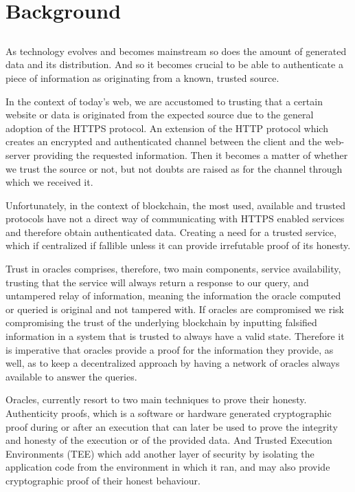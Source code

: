 \chapter{Background}\label{chap:chap3}

\section*{}
As technology evolves and becomes mainstream so does the amount of generated data and its distribution. And so it becomes crucial to be able to authenticate a piece of information as originating from a known, trusted source.

In the context of today's web, we are accustomed to trusting that a certain website or data is originated from the expected source due to the general adoption of the HTTPS protocol. An extension of the HTTP protocol which creates an encrypted and authenticated channel between the client and the web-server providing the requested information. Then it becomes a matter of whether we trust the source or not, but not doubts are raised as for the channel through which we received it.

Unfortunately, in the context of blockchain, the most used, available and trusted protocols have not a direct way of communicating with HTTPS enabled services and therefore obtain authenticated data. Creating a need for a trusted service, which if centralized if fallible unless it can provide irrefutable proof of its honesty.

Trust in oracles comprises, therefore, two main components, service availability, trusting that the service will always return a response to our query, and untampered relay of information, meaning the information the oracle computed or queried is original and not tampered with. If oracles are compromised we risk compromising the trust of the underlying blockchain by inputting falsified information in a system that is trusted to always have a valid state. Therefore it is imperative that oracles provide a proof for the information they provide, as well, as to keep a decentralized approach by having a network of oracles always available to answer the queries.

Oracles, currently resort to two main techniques to prove their honesty. Authenticity proofs, which is a software or hardware generated cryptographic proof during or after an execution that can later be used to prove the integrity and honesty of the execution or of the provided data. And Trusted Execution Environments (TEE) which add another layer of security by isolating the application code from the environment in which it ran, and may also provide cryptographic proof of their honest behaviour.

